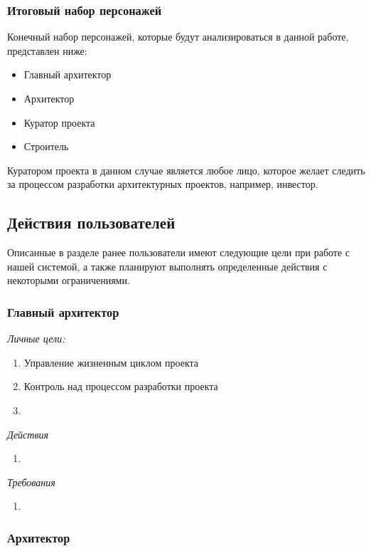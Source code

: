 \documentclass[a4paper,14pt]{extreport} %
\begin{document}
\subsubsection{Итоговый набор персонажей}

Конечный набор персонажей, которые будут анализироваться в данной работе, представлен ниже:
\begin{itemize}
\item Главный архитектор
\item Архитектор
\item Куратор проекта
\item Строитель
\end{itemize}

Куратором проекта в данном случае является любое лицо, которое желает следить за процессом разработки архитектурных проектов, например, инвестор.

\newpage
\subsection{Действия пользователей}

Описанные в разделе ранее пользователи имеют следующие цели при работе с нашей системой, а также планируют выполнять определенные действия с некоторыми ограничениями.

\subsubsection{Главный архитектор}

\textit{Личные цели:}
\begin{enumerate}
\item Управление жизненным циклом проекта
\item Контроль над процессом разработки проекта
\item 
\end{enumerate}

\textit{Действия}
\begin{enumerate}
\item 
\end{enumerate}

\textit{Требования}
\begin{enumerate}
\item 
\end{enumerate}

\subsubsection{Архитектор}
\end{document}
